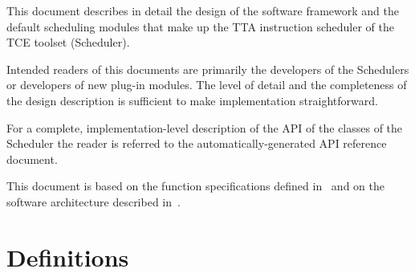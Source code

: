 \documentclass[a4paper,twoside]{tce}
\begin{document}
This document describes in detail the design of the software framework and
the default scheduling modules that make up the TTA instruction scheduler of
the TCE toolset (Scheduler).

Intended readers of this documents are primarily the developers of the
Schedulers or developers of new plug-in modules. The level of detail
and the completeness of the design description is sufficient to make
implementation straightforward.

For a complete, implementation-level description of the API of the classes
of the Scheduler the reader is referred to the automatically-generated API
reference document.

This document is based on the function specifications defined
in~\cite{SchedulerSpecs} and on the software architecture described
in~\cite{SchedulerArchitecture}.

\section{Definitions}
\end{document}
